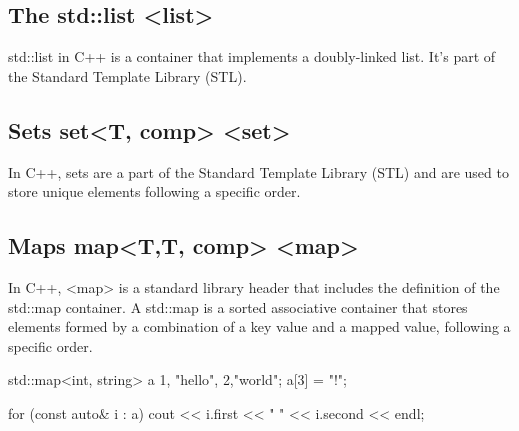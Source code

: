 \documentclass{report}
\begin{document}
    \bigbreak \noindent 
    \subsection{The std::list <list>}
    \bigbreak \noindent 
    \begin{concept}
       std::list in C++ is a container that implements a doubly-linked list. It's part of the Standard Template Library (STL). 
    \end{concept}
    

    \bigbreak \noindent 
    \subsection{Sets set<T, comp> <set>}
    \bigbreak \noindent 
    \begin{concept}
        In C++, sets are a part of the Standard Template Library (STL) and are used to store unique elements following a specific order.
    \end{concept}

    \bigbreak \noindent 
    \subsection{Maps map<T,T, comp> <map>}
    \bigbreak \noindent 
    \begin{concept}
    In C++, <map> is a standard library header that includes the definition of the std::map container. A std::map is a sorted associative container that stores elements formed by a combination of a key value and a mapped value, following a specific order. 
    \bigbreak \noindent 
    \begin{cppcode}
    std::map<int, string> a {{1, "hello"}, {2,"world"}};
    a[3] = "!";

    for (const auto& i : a) {
        cout << i.first << " " << i.second << endl;
    }
    \end{cppcode}
    \end{concept}
    \bigbreak \noindent 
\end{document}
